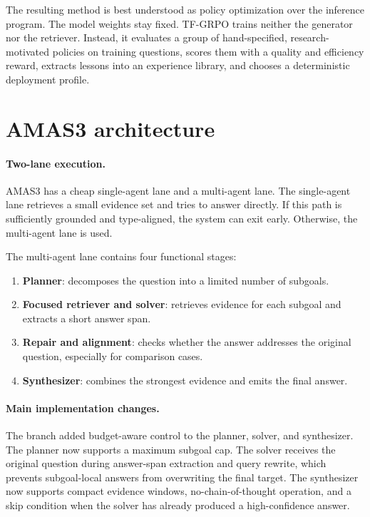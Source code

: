 \documentclass[10pt]{article}
\begin{document}
The resulting method is best understood as policy optimization over the inference program. The model weights stay fixed. TF-GRPO trains neither the generator nor the retriever. Instead, it evaluates a group of hand-specified, research-motivated policies on training questions, scores them with a quality and efficiency reward, extracts lessons into an experience library, and chooses a deterministic deployment profile.

\section{AMAS3 architecture}

\paragraph{Two-lane execution.}
AMAS3 has a cheap single-agent lane and a multi-agent lane. The single-agent lane retrieves a small evidence set and tries to answer directly. If this path is sufficiently grounded and type-aligned, the system can exit early. Otherwise, the multi-agent lane is used.

The multi-agent lane contains four functional stages:
\begin{enumerate}
  \item \textbf{Planner}: decomposes the question into a limited number of subgoals.
  \item \textbf{Focused retriever and solver}: retrieves evidence for each subgoal and extracts a short answer span.
  \item \textbf{Repair and alignment}: checks whether the answer addresses the original question, especially for comparison cases.
  \item \textbf{Synthesizer}: combines the strongest evidence and emits the final answer.
\end{enumerate}

\paragraph{Main implementation changes.}
The branch added budget-aware control to the planner, solver, and synthesizer. The planner now supports a maximum subgoal cap. The solver receives the original question during answer-span extraction and query rewrite, which prevents subgoal-local answers from overwriting the final target. The synthesizer now supports compact evidence windows, no-chain-of-thought operation, and a skip condition when the solver has already produced a high-confidence answer.
\end{document}
